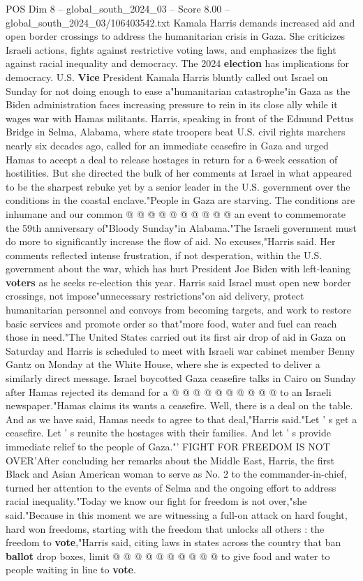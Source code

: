 \begin{textsample}{POS Dim 8 – global\_south\_2024\_03 – Score 8.00 – global\_south\_2024\_03/106403542.txt}  \label{ex:f8_pos_095}
Kamala Harris demands increased aid and open border crossings to address the humanitarian crisis in Gaza.
She criticizes Israeli actions, fights against restrictive voting laws, and emphasizes the fight against racial inequality and democracy.
The 2024 \textbf{election} has implications for democracy.
U.S. \textbf{Vice} President Kamala Harris bluntly called out Israel on Sunday for not doing enough to ease a"humanitarian catastrophe"in Gaza as the Biden administration faces increasing pressure to rein in its close ally while it wages war with Hamas militants.
Harris, speaking in front of the Edmund Pettus Bridge in Selma, Alabama, where state troopers beat U.S. civil rights marchers nearly six decades ago, called for an immediate ceasefire in Gaza and urged Hamas to accept a deal to release hostages in return for a 6-week cessation of hostilities.
But she directed the bulk of her comments at Israel in what appeared to be the sharpest rebuke yet by a senior leader in the U.S. government over the conditions in the coastal enclave."People in Gaza are starving.
The conditions are inhumane and our common @ @ @ @ @ @ @ @ @ @ an event to commemorate the 59th anniversary of"Bloody Sunday"in Alabama."The Israeli government must do more to significantly increase the flow of aid.
No excuses,"Harris said.
Her comments reflected intense frustration, if not desperation, within the U.S. government about the war, which has hurt President Joe Biden with left-leaning \textbf{voters} as he seeks re-election this year.
Harris said Israel must open new border crossings, not impose"unnecessary restrictions"on aid delivery, protect humanitarian personnel and convoys from becoming targets, and work to restore basic services and promote order so that"more food, water and fuel can reach those in need."The United States carried out its first air drop of aid in Gaza on Saturday and Harris is scheduled to meet with Israeli war cabinet member Benny Gantz on Monday at the White House, where she is expected to deliver a similarly direct message.
Israel boycotted Gaza ceasefire talks in Cairo on Sunday after Hamas rejected its demand for a @ @ @ @ @ @ @ @ @ @ to an Israeli newspaper."Hamas claims its wants a ceasefire.
Well, there is a deal on the table.
And as we have said, Hamas needs to agree to that deal,"Harris said."Let ' s get a ceasefire.
Let ' s reunite the hostages with their families.
And let ' s provide immediate relief to the people of Gaza."' FIGHT FOR FREEDOM IS NOT OVER'After concluding her remarks about the Middle East, Harris, the first Black and Asian American woman to serve as No. 2 to the commander-in-chief, turned her attention to the events of Selma and the ongoing effort to address racial inequality."Today we know our fight for freedom is not over,"she said."Because in this moment we are witnessing a full-on attack on hard fought, hard won freedoms, starting with the freedom that unlocks all others : the freedom to \textbf{vote},"Harris said, citing laws in states across the country that ban \textbf{ballot} drop boxes, limit @ @ @ @ @ @ @ @ @ @ to give food and water to people waiting in line to \textbf{vote}.

\end{textsample}
